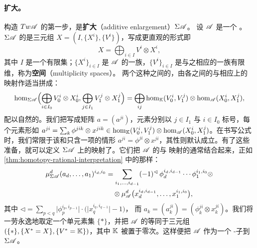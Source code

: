 \paragraph{\trAdditive{}扩大。}\label{sub:additive-enlargement}
构造 $Tw\mathscr{A}$ 的第一步，是\textbf{\trAdditive{}扩大}（additive enlargement）$\Sigma\mathscr{A}$。
设 $\mathscr{A}$ 是一个\trNonunital{} \trACategory。$\Sigma\mathscr{A}$ 的\trObject{}是三元组
$X=(I,\{X^i\},\{V^i\})$，写成更直观的形式\trDirectSum{}即
\begin{equation}\label{eq:sigma-formal-direct-sum}
X=\bigoplus_{i\in I}V^i\otimes X^i,
\end{equation}
其中 $I$ 是一个有限集；$\{X^i\}_{i\in I}$ 是 $\mathscr{A}$ 的一族\trObject，$\{V^i\}_{i\in I}$
是与之相应的一族有限维\trGraded\trVectorSpace，称为\textbf{\trMultiplicity{}空间}（multiplicity spaces）。
两个这种\trDirectSum{}之间的\trMorphism，由各\trDirectSummand{}之间的\trMorphism{}与相应\trVectorSpace{}上的%
\trLinear{}映射作适当\trTensorProduct{}拼成：
\begin{equation}\label{eq:sigma-morphism-spaces}
\hom_{\Sigma\mathscr{A}}\Bigl(\bigoplus_{i\in I_0}V_0^i\otimes X_0^i,
\bigoplus_{j\in I_1}V_1^j\otimes X_1^j\Bigr)
=\bigoplus_{ij}\hom_{\mathbb{K}}(V_0^i,V_1^j)\otimes\hom_{\mathscr{A}}(X_0^i,X_1^j),
\end{equation}
配以自然的\trGrading。我们把\trMorphism{}写成矩阵 $a=(a^{ji})$，元素分别以 $j\in I_1$ 与
$i\in I_0$ 标号，每个元素形如
$a^{ji}=\sum_k\phi^{jik}\otimes x^{jik}\in\hom_{\mathbb{K}}(V_0^i,V_1^j)
\otimes\hom_{\mathscr{A}}(X_0^i,X_1^j)$。在书写公式时，我们常限于该和只含一项的情形
$a^{ji}=\phi^{ji}\otimes x^{ji}$，其\trLinear{}性则默认成立。有了这些准备，就可以定义
$\Sigma\mathscr{A}$ 上的\trComposition{}映射了。它们把 $\mathscr{A}$ 的\trComposition{}与%
\trLinear{}映射的通常\trComposition{}结合起来，正如\cref{thm:homotopy-rational-interpretation}
中的\trTensorProduct{}那样：
\begin{equation}\label{eq:sigma-composition}
\begin{split}
\mu^d_{\Sigma\mathscr{A}}(a_d,\ldots,a_1)^{i_d,i_0}
&=\sum_{i_1,\ldots,i_{d-1}}(-1)^{\lhd}\,
\phi_d^{i_d,i_{d-1}}\cdots\phi_1^{i_1,i_0}\otimes\\
&\quad\otimes\mu^d_{\mathscr{A}}\bigl(x_d^{i_d,i_{d-1}},\ldots,x_1^{i_1,i_0}\bigr),
\end{split}
\end{equation}
其中
$\lhd=\sum_{p<q}\bigl|\phi_p^{i_p,i_{p-1}}\bigr|\cdot
\bigl(\bigl|x_q^{i_q,i_{q-1}}\bigr|-1\bigr)$，
而 $a_k=(a_k^{ji})=(\phi_k^{ji}\otimes x_k^{ji})$。我们将一劳永逸地取定一个单元素集
$\{*\}$，并把 $\mathscr{A}$ 的\trObject{}等同于三元组
$(\{*\},\{X^*=X\},\{V^*=\mathbb{K}\})$，其中 $\mathbb{K}$ 被置于零次。这样便把 $\mathscr{A}$ 作为一个%
\trFull{} \trAinfty-子\trCategory{}\trEmbedding{}到 $\Sigma\mathscr{A}$。
